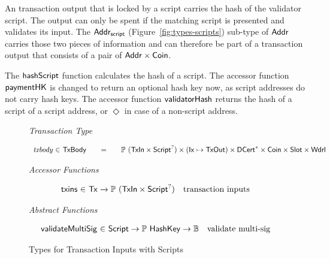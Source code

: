 \documentclass[11pt,a4paper,dvipsnames]{article}
\newcommand{\Nothing}{\ensuremath{\Diamond}}
\newcommand{\Bool}{\ensuremath{\mathbb{B}}}
\newcommand{\Tx}{\type{Tx}}
\newcommand{\TxBody}{\type{TxBody}}
\newcommand{\Ix}{\type{Ix}}
\newcommand{\Addr}{\type{Addr}}
\newcommand{\Wdrl}{\type{Wdrl}}
\newcommand{\Coin}{\type{Coin}}
\newcommand{\Slot}{\type{Slot}}
\newcommand{\DCert}{\type{DCert}}
\newcommand{\AddrScr}{\type{Addr_{script}}}
\newcommand{\Script}{\type{Script}}
\newcommand{\TxIn}{\type{TxIn}}
\newcommand{\TxOut}{\type{TxOut}}
\newcommand{\HashKey}{\type{HashKey}}
\theoremstyle{definition}
\begin{document}
An transaction output that is locked by a script carries the hash of the
validator script. The output can only be spent if the matching script is
presented and validates its input. The $\AddrScr$
(Figure~\ref{fig:types-scripts}) sub-type of $\Addr$ carries those two pieces of
information and can therefore be part of a transaction output that consists of a
pair of $\Addr\times\Coin$.

The $\mathsf{hashScript}$ function calculates the hash of a script. The accessor
function $\mathsf{paymentHK}$ is changed to return an optional hash key now, as
script addresses do not carry hash keys. The accessor function
$\mathsf{validatorHash}$ returns the hash of a script of a script address, or
$\Nothing$ in case of a non-script address.

\begin{figure*}[hbt]
  \emph{Transaction Type}

  \begin{equation*}
    \begin{array}{r@{~\in~}l@{\qquad=\qquad}l}
      \var{txbody}
      & \TxBody
      & \powerset{(\TxIn \times \Script^{?})} \times (\Ix \mapsto \TxOut) \times \seqof{\DCert}
        \times \Coin \times \Slot \times \Wdrl
      \\
    \end{array}
  \end{equation*}

  \emph{Accessor Functions}

  \begin{equation*}
    \begin{array}{r@{~\in~}lr}
      \fun{txins} & \Tx \to \powerset{(\TxIn \times \Script^{?})} & \text{transaction inputs}
    \end{array}
  \end{equation*}

  \emph{Abstract Functions}

  \begin{equation*}
    \begin{array}{r@{~\in~}lr}
      \fun{validateMultiSig} & \Script \to \powerset\HashKey \to \Bool &
                                                                         \text{validate
                                                                         multi-sig}
    \end{array}
  \end{equation*}
  \caption{Types for Transaction Inputs with Scripts}
  \label{fig:types_defs_multi}
\end{figure*}
\end{document}
